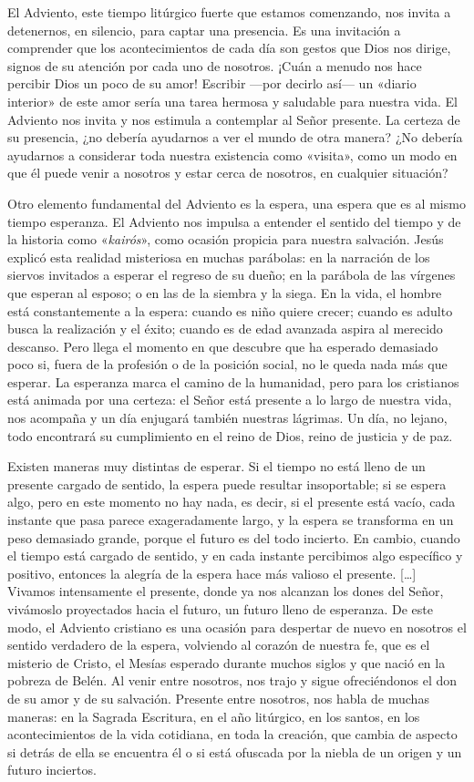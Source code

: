 \documentclass[]{article}
\begin{document}
El Adviento, este tiempo litúrgico fuerte que estamos comenzando, nos
invita a detenernos, en silencio, para captar una presencia. Es una
invitación a comprender que los acontecimientos de cada día son gestos
que Dios nos dirige, signos de su atención por cada uno de nosotros.
¡Cuán a menudo nos hace percibir Dios un poco de su amor! Escribir
---por decirlo así--- un «diario interior» de este amor sería una tarea
hermosa y saludable para nuestra vida. El Adviento nos invita y nos
estimula a contemplar al Señor presente. La certeza de su presencia, ¿no
debería ayudarnos a ver el mundo de otra manera? ¿No debería ayudarnos a
considerar toda nuestra existencia como «visita», como un modo en que él
puede venir a nosotros y estar cerca de nosotros, en cualquier
situación?

Otro elemento fundamental del Adviento es la espera, una espera que es
al mismo tiempo esperanza. El Adviento nos impulsa a entender el sentido
del tiempo y de la historia como «\emph{kairós}», como ocasión propicia
para nuestra salvación. Jesús explicó esta realidad misteriosa en muchas
parábolas: en la narración de los siervos invitados a esperar el regreso
de su dueño; en la parábola de las vírgenes que esperan al esposo; o en
las de la siembra y la siega. En la vida, el hombre está constantemente
a la espera: cuando es niño quiere crecer; cuando es adulto busca la
realización y el éxito; cuando es de edad avanzada aspira al merecido
descanso. Pero llega el momento en que descubre que ha esperado
demasiado poco si, fuera de la profesión o de la posición social, no le
queda nada más que esperar. La esperanza marca el camino de la
humanidad, pero para los cristianos está animada por una certeza: el
Señor está presente a lo largo de nuestra vida, nos acompaña y un día
enjugará también nuestras lágrimas. Un día, no lejano, todo encontrará
su cumplimiento en el reino de Dios, reino de justicia y de paz.

Existen maneras muy distintas de esperar. Si el tiempo no está lleno de
un presente cargado de sentido, la espera puede resultar insoportable;
si se espera algo, pero en este momento no hay nada, es decir, si el
presente está vacío, cada instante que pasa parece exageradamente largo,
y la espera se transforma en un peso demasiado grande, porque el futuro
es del todo incierto. En cambio, cuando el tiempo está cargado de
sentido, y en cada instante percibimos algo específico y positivo,
entonces la alegría de la espera hace más valioso el presente.
{[}\ldots{}{]} Vivamos intensamente el presente, donde ya nos alcanzan
los dones del Señor, vivámoslo proyectados hacia el futuro, un futuro
lleno de esperanza. De este modo, el Adviento cristiano es una ocasión
para despertar de nuevo en nosotros el sentido verdadero de la espera,
volviendo al corazón de nuestra fe, que es el misterio de Cristo, el
Mesías esperado durante muchos siglos y que nació en la pobreza de
Belén. Al venir entre nosotros, nos trajo y sigue ofreciéndonos el don
de su amor y de su salvación. Presente entre nosotros, nos habla de
muchas maneras: en la Sagrada Escritura, en el año litúrgico, en los
santos, en los acontecimientos de la vida cotidiana, en toda la
creación, que cambia de aspecto si detrás de ella se encuentra él o si
está ofuscada por la niebla de un origen y un futuro inciertos.
\end{document}
